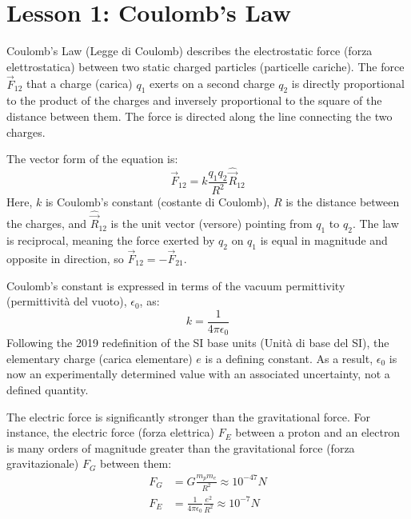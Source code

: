 \section*{Lesson 1: Coulomb's Law}

Coulomb's Law (Legge di Coulomb) describes the electrostatic force (forza elettrostatica) between two static charged particles (particelle cariche). The force \(\vec{F}_{12}\) that a charge (carica) \(q_{1}\) exerts on a second charge \(q_{2}\) is directly proportional to the product of the charges and inversely proportional to the square of the distance between them. The force is directed along the line connecting the two charges.

The vector form of the equation is:
\begin{equation} 
    \vec{F}_{12} = k \frac{q_1 q_2}{R^2} \hat{\vec{R}}_{12}
\end{equation}
Here, \(k\) is Coulomb's constant (costante di Coulomb), \(R\) is the distance between the charges, and \(\hat{\vec{R}}_{12}\) is the unit vector (versore) pointing from \(q_{1}\) to \(q_{2}\). The law is reciprocal, meaning the force exerted by \(q_{2}\) on \(q_{1}\) is equal in magnitude and opposite in direction, so \(\vec{F}_{12} = -\vec{F}_{21}\).

Coulomb's constant is expressed in terms of the vacuum permittivity (permittività del vuoto), \(\epsilon_{0}\), as:
\begin{equation} 
    k = \frac{1}{4\pi\epsilon_{0}}
\end{equation}
Following the 2019 redefinition of the SI base units (Unità di base del SI), the elementary charge (carica elementare) \(e\) is a defining constant. As a result, \(\epsilon_{0}\) is now an experimentally determined value with an associated uncertainty, not a defined quantity.

The electric force is significantly stronger than the gravitational force. For instance, the electric force (forza elettrica) \(F_{E}\) between a proton and an electron is many orders of magnitude greater than the gravitational force (forza gravitazionale) \(F_{G}\) between them:
\begin{align}
    F_G &= G \frac{m_p m_e}{R^2} \approx 10^{-47} N \\
    F_E &= \frac{1}{4\pi\epsilon_{0}} \frac{e^2}{R^2} \approx 10^{-7} N
\end{align}
